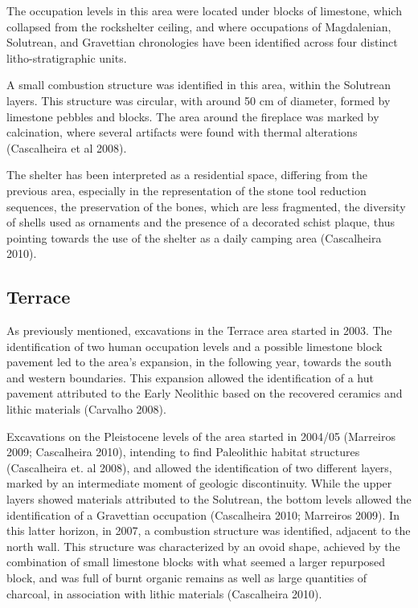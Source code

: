 \documentclass[12pt,twoside]{reedthesis}
\begin{document}
The occupation levels in this area were located under blocks of limestone, which collapsed from the rockshelter ceiling, and where occupations of Magdalenian, Solutrean, and Gravettian chronologies have been identified across four distinct litho-stratigraphic units.

A small combustion structure was identified in this area, within the Solutrean layers. This structure was circular, with around 50 cm of diameter, formed by limestone pebbles and blocks. The area around the fireplace was marked by calcination, where several artifacts were found with thermal alterations (Cascalheira et al 2008).

The shelter has been interpreted as a residential space, differing from the previous area, especially in the representation of the stone tool reduction sequences, the preservation of the bones, which are less fragmented, the diversity of shells used as ornaments and the presence of a decorated schist plaque, thus pointing towards the use of the shelter as a daily camping area (Cascalheira 2010).

\hypertarget{terrace}{%
\subsection{Terrace}\label{terrace}}

As previously mentioned, excavations in the Terrace area started in 2003. The identification of two human occupation levels and a possible limestone block pavement led to the area's expansion, in the following year, towards the south and western boundaries. This expansion allowed the identification of a hut pavement attributed to the Early Neolithic based on the recovered ceramics and lithic materials (Carvalho 2008).

Excavations on the Pleistocene levels of the area started in 2004/05 (Marreiros 2009; Cascalheira 2010), intending to find Paleolithic habitat structures (Cascalheira et. al 2008), and allowed the identification of two different layers, marked by an intermediate moment of geologic discontinuity. While the upper layers showed materials attributed to the Solutrean, the bottom levels allowed the identification of a Gravettian occupation (Cascalheira 2010; Marreiros 2009). In this latter horizon, in 2007, a combustion structure was identified, adjacent to the north wall. This structure was characterized by an ovoid shape, achieved by the combination of small limestone blocks with what seemed a larger repurposed block, and was full of burnt organic remains as well as large quantities of charcoal, in association with lithic materials (Cascalheira 2010).
\end{document}
